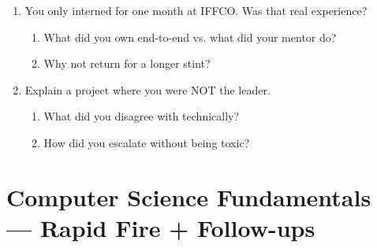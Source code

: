\documentclass[9pt,a4paper]{article}
\begin{document}
\begin{enumerate}[label=\textbf{Q\arabic*:}, leftmargin=*]
\begin{enumerate}[label=\textit{FU\arabic*:}, leftmargin=2em]
    \item Give an example from the last 30 days.
    \item How would that weakness hurt our team in week one?
  \end{enumerate}
  \item You only interned for one month at IFFCO. Was that real experience?
  \begin{enumerate}[label=\textit{FU\arabic*:}, leftmargin=2em]
    \item What did you own end-to-end vs. what did your mentor do?
    \item Why not return for a longer stint?
  \end{enumerate}
  \item Explain a project where you were NOT the leader.
  \begin{enumerate}[label=\textit{FU\arabic*:}, leftmargin=2em]
    \item What did you disagree with technically?
    \item How did you escalate without being toxic?
  \end{enumerate}
\end{enumerate}
\newpage
\section{Computer Science Fundamentals --- Rapid Fire + Follow-ups}
\end{document}
